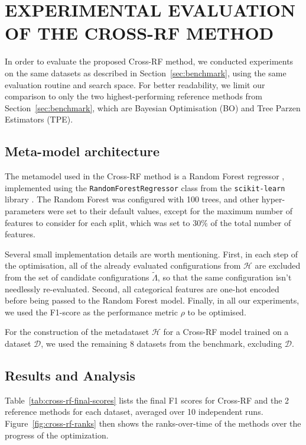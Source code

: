 \section{\uppercase{Experimental evaluation of the Cross-RF method}}
\label{sec:experimental-evaluation}

In order to evaluate the proposed Cross-RF method, we conducted experiments on the same datasets as described in Section~\ref{sec:benchmark}, using the same evaluation routine and search space. For better readability, we limit our comparison to only the two highest-performing reference methods from Section~\ref{sec:benchmark}, which are Bayesian Optimisation (BO) and Tree Parzen Estimators (TPE).

\subsection{Meta-model architecture}

The metamodel used in the Cross-RF method is a Random Forest regressor \cite{breiman_random_2001}, implemented using the \texttt{RandomForestRegressor} class from the \texttt{scikit-learn} library \cite{pedregosa_scikit-learn_2011}. The Random Forest was configured with 100 trees, and other hyper-parameters were set to their default values, except for the maximum number of features to consider for each split, which was set to \( 30\% \) of the total number of features.

Several small implementation details are worth mentioning. First, in each step of the optimisation, all of the already evaluated configurations from \( \mathcal{H} \) are excluded from the set of candidate configurations \( \tilde{\Lambda} \), so that the same configuration isn't needlessly re-evaluated. Second, all categorical features are one-hot encoded before being passed to the Random Forest model. Finally, in all our experiments, we used the F1-score as the performance metric \( \rho \) to be optimised.

For the construction of the metadataset \( \mathcal{H} \) for a Cross-RF model trained on a dataset \( \mathcal{D} \), we used the remaining 8 datasets from the benchmark, excluding \( \mathcal{D} \).

\subsection{Results and Analysis}
Table~\ref{tab:cross-rf-final-scores} lists the final F1 scores for Cross-RF and the 2 reference methods for each dataset, averaged over 10 independent runs. Figure~\ref{fig:cross-rf-ranks} then shows the ranks-over-time of the methods over the progress of the optimization.

